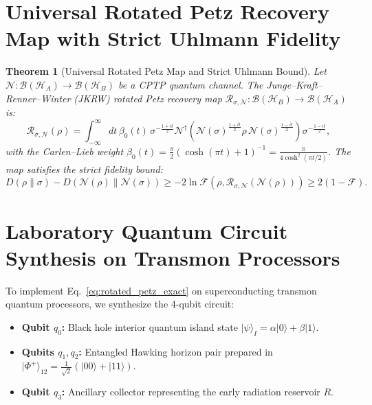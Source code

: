 \documentclass[11pt,a4paper,reqno]{article}
\newtheorem{theorem}{Theorem}[section]
\theoremstyle{definition}
\newcommand{\ket}[1]{\lvert #1 \rangle}
\numberwithin{equation}{section}
\begin{document}
\section{Universal Rotated Petz Recovery Map with Strict Uhlmann Fidelity}
\label{sec:rotated_petz_theory}

\begin{theorem}[Universal Rotated Petz Map and Strict Uhlmann Bound]
Let $\mathcal{N}: \mathcal{B}(\mathcal{H}_A) \to \mathcal{B}(\mathcal{H}_B)$ be a CPTP quantum channel. The Junge--Kraft--Renner--Winter (JKRW) rotated Petz recovery map $\mathcal{R}_{\sigma, \mathcal{N}}: \mathcal{B}(\mathcal{H}_B) \to \mathcal{B}(\mathcal{H}_A)$ \cite{Junge2018} is:
\begin{equation}
\mathcal{R}_{\sigma, \mathcal{N}}(\rho) = \int_{-\infty}^\infty dt\, \beta_0(t)\, \sigma^{-\frac{1+it}{2}} \mathcal{N}^\dagger\left( \mathcal{N}(\sigma)^{\frac{1+it}{2}} \rho\, \mathcal{N}(\sigma)^{\frac{1-it}{2}} \right) \sigma^{-\frac{1-it}{2}},
\label{eq:rotated_petz_exact}
\end{equation}
with the Carlen--Lieb weight $\beta_0(t) = \frac{\pi}{2} (\cosh(\pi t) + 1)^{-1} = \frac{\pi}{4 \cosh^2(\pi t / 2)}$. The map satisfies the strict fidelity bound:
\begin{equation}
D(\rho \| \sigma) - D(\mathcal{N}(\rho) \| \mathcal{N}(\sigma)) \ge -2 \ln \mathcal{F}\left(\rho, \mathcal{R}_{\sigma, \mathcal{N}}(\mathcal{N}(\rho))\right) \ge 2\left(1 - \mathcal{F}\right).
\label{eq:petz_bound_exact}
\end{equation}
\end{theorem}

\section{Laboratory Quantum Circuit Synthesis on Transmon Processors}
\label{sec:petz_quantum}

To implement Eq.~\eqref{eq:rotated_petz_exact} on superconducting transmon quantum processors, we synthesize the 4-qubit circuit:
\begin{itemize}
    \item \textbf{Qubit $q_0$:} Black hole interior quantum island state $\ket{\psi}_I = \alpha \ket{0} + \beta \ket{1}$.
    \item \textbf{Qubits $q_1, q_2$:} Entangled Hawking horizon pair prepared in $\ket{\Phi^+}_{12} = \frac{1}{\sqrt{2}}(\ket{00} + \ket{11})$.
    \item \textbf{Qubit $q_3$:} Ancillary collector representing the early radiation reservoir $R$.
\end{itemize}
\end{document}
